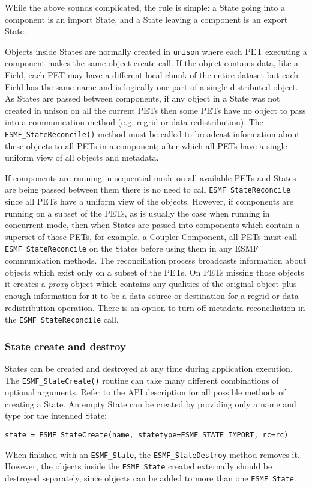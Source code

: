 While the above sounds complicated, the rule is simple:
a State going into a component is an import State, and a 
State leaving a component is an export State.

Objects inside States are normally created in {\tt unison} where
each PET executing a component makes the same object create call.
If the object contains data, like a Field, each PET may have a
different local chunk of the entire dataset but each Field has
the same name and is logically one part of a single distributed 
object.   As States are passed between components, if any object
in a State was not created in unison on all the current PETs 
then some PETs have no object to pass into a
communication method (e.g. regrid or data redistribution).
The {\tt ESMF\_StateReconcile()} method must be called to broadcast 
information about these objects to all PETs in a component;
after which all PETs have a single uniform view of all objects and metadata.  

If components are running in sequential mode on all available PETs
and States are being passed between them there is no need to call 
{\tt ESMF\_StateReconcile} since all PETs have a uniform view of the objects.
However, if components are running on a subset of the PETs, as is
usually the case when running in concurrent mode, then when States
are passed into components which contain a superset of those PETs,
for example, a Coupler Component, all PETs must call {\tt ESMF\_StateReconcile}
on the States before using them in any ESMF communication methods.
The reconciliation process broadcasts information about objects
which exist only on a subset of the PETs.  On PETs missing those
objects it creates a {\it proxy} object which contains any
qualities of the original object plus enough information for it
to be a data source or destination for a regrid or data redistribution
operation.  There is an option to turn off metadata reconciliation in the 
{\tt ESMF\_StateReconcile} call.

\subsubsection{State create and destroy}

States can be created and destroyed at any time during
application execution.  The {\tt ESMF\_StateCreate()} routine
can take many different combinations of optional arguments.  Refer
to the API description for all possible methods of creating a State.
An empty State can be created by providing only a name and type for
the intended State:

{\tt state = ESMF\_StateCreate(name, statetype=ESMF\_STATE\_IMPORT, rc=rc)}

When finished with an {\tt ESMF\_State}, the {\tt ESMF\_StateDestroy} method
removes it.  However, the objects inside the {\tt ESMF\_State}
created externally should be destroyed separately,
since objects can be added to more than one {\tt ESMF\_State}.
